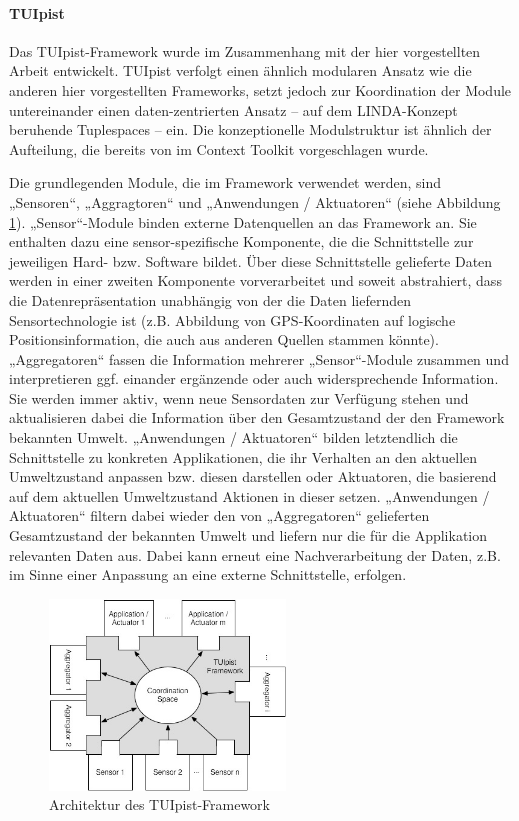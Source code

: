 \paragraph{TUIpist} %
\label{par:tuipist}

Das TUIpist-Framework \citep{Furtmuller07} wurde im Zusammenhang mit der hier vorgestellten Arbeit entwickelt\citep{Furtmuller07a}. TUIpist verfolgt einen ähnlich modularen Ansatz wie die anderen hier vorgestellten Frameworks, setzt jedoch zur Koordination der Module untereinander einen daten-zentrierten Ansatz -- auf dem LINDA-Konzept \citep{Carriero89} beruhende Tuplespaces -- ein. Die konzeptionelle Modulstruktur ist ähnlich der Aufteilung, die bereits von \citet{Dey01} im Context Toolkit vorgeschlagen wurde.

Die grundlegenden Module, die im Framework verwendet werden, sind „Sensoren“, „Aggragtoren“ und „Anwendungen / Aktuatoren“ (siehe Abbildung \ref{fig:img_ImplementierungInput_TUIpist}). „Sensor“-Module binden externe Datenquellen an das Framework an. Sie enthalten dazu eine sensor-spezifische Komponente, die die Schnittstelle zur jeweiligen Hard- bzw. Software bildet. Über diese Schnittstelle gelieferte Daten werden in einer zweiten Komponente vorverarbeitet und soweit abstrahiert, dass die Datenrepräsentation unabhängig von der die Daten liefernden Sensortechnologie ist (z.B. Abbildung von GPS-Koordinaten auf logische Positionsinformation, die auch aus anderen Quellen stammen könnte). „Aggregatoren“ fassen die Information mehrerer „Sensor“-Module zusammen und interpretieren ggf. einander ergänzende oder auch widersprechende Information. Sie werden immer aktiv, wenn neue Sensordaten zur Verfügung stehen und aktualisieren dabei die Information über den Gesamtzustand der den Framework bekannten Umwelt. „Anwendungen / Aktuatoren“ bilden letztendlich die Schnittstelle zu konkreten Applikationen, die ihr Verhalten an den aktuellen Umweltzustand anpassen bzw. diesen darstellen oder Aktuatoren, die basierend auf dem aktuellen Umweltzustand Aktionen in dieser setzen. „Anwendungen / Aktuatoren“ filtern dabei wieder den von „Aggregatoren“ gelieferten Gesamtzustand der bekannten Umwelt und liefern nur die für die Applikation relevanten Daten aus. Dabei kann erneut eine Nachverarbeitung der Daten, z.B. im Sinne einer Anpassung an eine externe Schnittstelle, erfolgen.

\begin{figure}[htbp]
	\centering
		\includegraphics[height=2in]{img/ImplementierungInput/TUIpistArchitecture.jpg}
	\caption{Architektur des TUIpist-Framework \citep{Furtmuller07a}}
	\label{fig:img_ImplementierungInput_TUIpist}
\end{figure}

